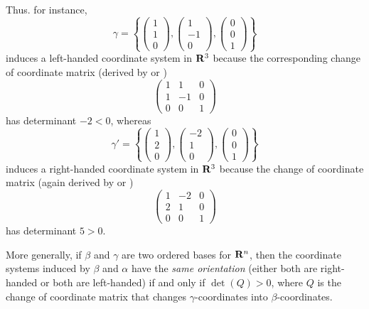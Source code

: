 Thus. for instance,
\[
    \gamma = \left\{
                \begin{pmatrix} 1 \\ 1 \\ 0 \end{pmatrix},
                \begin{pmatrix} 1 \\ -1 \\ 0 \end{pmatrix},
                \begin{pmatrix} 0 \\ 0 \\ 1 \end{pmatrix}
             \right\}
\]
induces a left-handed coordinate system in \(\mathbf{R}^3\) because the corresponding change of coordinate matrix (derived by  or )
\[
    \begin{pmatrix}
        1 & 1 & 0 \\
        1 & -1 & 0 \\
        0 & 0 & 1
    \end{pmatrix}
\]
has determinant \(-2 < 0\), whereas
\[
    \gamma' = \left\{
                \begin{pmatrix} 1 \\ 2 \\ 0 \end{pmatrix},
                \begin{pmatrix} -2 \\ 1 \\ 0 \end{pmatrix},
                \begin{pmatrix} 0 \\ 0 \\ 1 \end{pmatrix}
             \right\}
\]
induces a right-handed coordinate system in \(\mathbf{R}^3\) because the change of coordinate matrix (again derived by  or )
\[
    \begin{pmatrix}
        1 & -2 & 0 \\
        2 & 1 & 0 \\
        0 & 0 & 1
    \end{pmatrix}
\]
has determinant \(5 > 0\).

More generally, if \(\beta\) and \(\gamma\) are two ordered bases for \(\mathbf{R}^n\), then the coordinate systems induced by \(\beta\) and \(\alpha\) have the \emph{same orientation} (either both are right-handed or both are left-handed)
if and only if \(\det(Q) > 0\), where \(Q\) is the change of coordinate matrix that changes \(\gamma\)-coordinates into \(\beta\)-coordinates.

